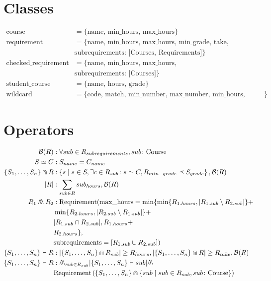 \documentclass{article}
\begin{document}
\section{Classes}
\begin{align*}
  \mbox{course} &= \{\mbox{name, min\_hours, max\_hours}\} \\
  \mbox{requirement} &= \{\mbox{name, min\_hours, max\_hours, min\_grade,
  take,} \\ &\mbox{subrequirements: [Courses, Requirements]}\} \\
  \mbox{checked\_requirement} &= \{\mbox{name, min\_hours, max\_hours,
  } \\ &\mbox{subrequirements: [Courses]}\} \\
  \mbox{student\_course} &= \{\mbox{name, hours, grade}\} \\
  \mbox{wildcard} &= \{\mbox{code, match, min\_number, max\_number, min\_hours,
  exclude}\}
\end{align*}

\section{Operators}
\begin{align*}
  \mathcal{B}(R) &: \forall sub \in R_{subrequirements}, sub \colon \mbox{Course}
  \\
  S \simeq C &: S_{name} = C_{name} \\
  \{S_1,\ldots,S_n\}\Cap R &: \left\{ s \mid s \in S, \exists c
  \in R_{sub} \colon s \simeq C, R_{min\_grade} \preceq S_{grade} \right\}, \mathcal{B}(R) \\
  |R| &: \sum_{sub \in R} sub_{hours}, \mathcal{B}(R) \\
  R_1 \merge R_2 &: \mbox{Requirement}(\mbox{max\_hours} = \min\{\min\{R_{1.hours},
  |R_{1.sub} \setminus R_{2.sub}|\} + \\  &\min\{R_{2.hours}, |R_{2.sub}
  \setminus R_{1.sub}|\} + \\ &|R_{1.sub} \cap R_{2.sub}|, R_{1.hours} + \\
                            &R_{2.hours}\}, \\ &\mbox{subrequirements} =
  [R_{1.sub} \cup R_{2.sub}])
  \\
  \{S_1,\ldots,S_n\} \vdash R &: |\{S_1, \ldots, S_n\} \Cap R_{sub}| \geq
  R_{hours}, |\{S_1, \ldots, S_n\} \Cap R| \geq R_{take}, \mathcal{B}(R) \\
  \{S_1,\ldots,S_n\} \vdash R &: \merge_{sub \in R_{sub}} |\{S_1,\ldots,S_n\}
  \vdash sub| \merge \\
  & \mbox{Requirement}\left(\{S_1,\ldots,S_n\} \Cap \left\{sub
  \mid sub \in R_{sub}, sub \colon \mbox{Course} \right\}\right)
\end{align*}
\end{document}

